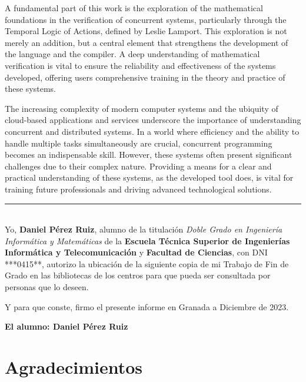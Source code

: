 A fundamental part of this work is the exploration of the mathematical foundations in the verification of concurrent systems, particularly through the Temporal Logic of Actions, defined by Leslie Lamport. This exploration is not merely an addition, but a central element that strengthens the development of the language and the compiler. A deep understanding of mathematical verification is vital to ensure the reliability and effectiveness of the systems developed, offering users comprehensive training in the theory and practice of these systems.

The increasing complexity of modern computer systems and the ubiquity of cloud-based applications and services underscore the importance of understanding concurrent and distributed systems. In a world where efficiency and the ability to handle multiple tasks simultaneously are crucial, concurrent programming becomes an indispensable skill. However, these systems often present significant challenges due to their complex nature. Providing a means for a clear and practical understanding of these systems, as the developed tool does, is vital for training future professionals and driving advanced technological solutions.



\cleardoublepage

\thispagestyle{empty}

\noindent\rule[-1ex]{\textwidth}{2pt}\\[4.5ex]

Yo, \textbf{Daniel Pérez Ruiz}, alumno de la titulación \textit{Doble Grado en Ingeniería Informática y Matemáticas} de la \textbf{Escuela Técnica Superior de Ingenierías Informática y Telecomunicación} y \textbf{Facultad de Ciencias}, con DNI ***0415**, autorizo la ubicación de la siguiente copia de mi Trabajo de Fin de Grado en las bibliotecas de los centros para que pueda ser consultada por personas que lo deseen.

\vspace{0.5cm}

\noindent
Y para que conste, firmo el presente informe en Granada a Diciembre de 2023.

\vspace{1cm}

\noindent
\textbf{El alumno: Daniel Pérez Ruiz}

\chapter*{Agradecimientos}

